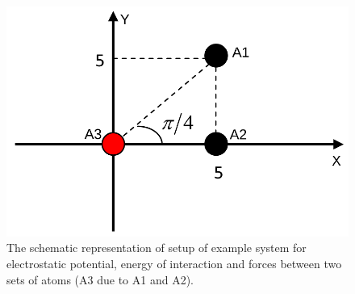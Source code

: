 \documentclass[9pt,tutorial]{livecoms}
\begin{document}
\begin{figure}[hbt!]
\includegraphics[width=\linewidth]{Figure_10.png}
\caption{The schematic representation of setup of example system for electrostatic potential, energy of interaction and forces between two sets of atoms (A3 due to A1 and A2).}
\label{fig:elec_force}
\end{figure}
\end{document}
